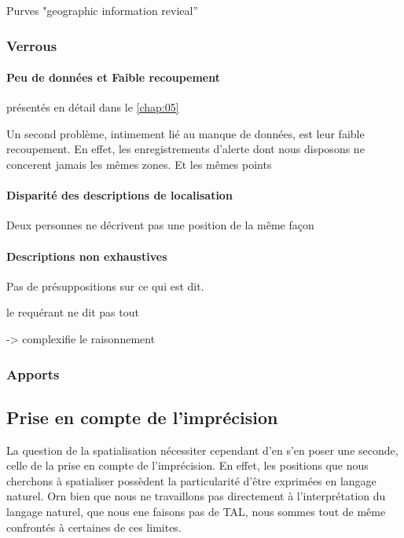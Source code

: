 Purves "geographic information revieal''

\subsubsection{Verrous}

\paragraph{Peu de données et Faible recoupement}

présentés en détail dans le \autoref{chap:05}

Un second problème, intimement lié au manque de données, est leur
faible recoupement. En effet, les enregistrements d'alerte dont nous
disposons ne concerent jamais les mêmes zones. Et les mêmes points


\paragraph{Disparité des descriptions de localisation}

Deux personnes ne décrivent pas une position de la même façon

\paragraph{Descriptions non exhaustives}

Pas de présuppositions sur ce qui est dit.

le requérant ne dit pas tout

-> complexifie le raisonnement

\subsubsection{Apports}

\subsection{Prise en compte de l'imprécision}
\label{subsec:2-1-2}

La question de la spatialisation nécessiter cependant d'en s'en poser
une seconde, celle de la prise en compte de l'imprécision. En effet,
les positions que nous cherchons à spatialiser possèdent la
particularité d'être exprimées en langage naturel. Orn bien que nous
ne travaillons pas directement à l'interprétation du langage naturel,
\ie que nous ene faisons pas de TAL, nous sommes tout de même
confrontés à certaines de ces limites.

